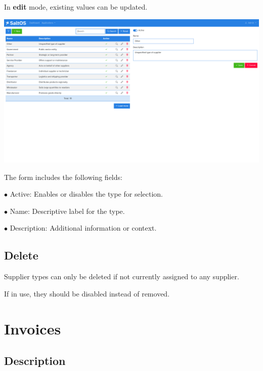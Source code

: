 \documentclass[a4paper]{article}
\begin{document}
In \textbf{edit} mode, existing values can be updated.

\begin{center}\includegraphics[width=1\textwidth]{../ujest/snaps/test-screenshots-js-screenshots-purchases-suppliers-types-edit-10-en-us-1-snap.png}\end{center}

The form includes the following fields:

\begin{compactitem}
\item[\color{myblue}$\bullet$] Active: Enables or disables the type for selection.
\item[\color{myblue}$\bullet$] Name: Descriptive label for the type.
\item[\color{myblue}$\bullet$] Description: Additional information or context.
\end{compactitem}

\hypertarget{toc135}{}
\subsection{Delete}

Supplier types can only be deleted if not currently assigned to any supplier.

If in use, they should be disabled instead of removed.


\hypertarget{toc136}{}
\section{Invoices}

\hypertarget{toc137}{}
\subsection{Description}
\end{document}
